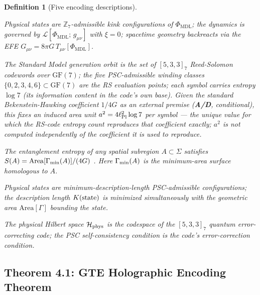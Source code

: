 \documentclass[11pt]{article}
\newtheorem{definition}[theorem]{Definition}
\theoremstyle{remark}
\newcommand{\PHIMDL}{\Phi_{\mathrm{MDL}}}
\newcommand{\ZS}{\mathbb{Z}_7}
\newcommand{\lPl}{\ell_{\rm Pl}}
\newcommand{\Gmunu}{G_{\mu\nu}}
\newcommand{\Tmunu}{T_{\mu\nu}}
\newcommand{\LL}{\mathcal{L}}
\newcommand{\CatAD}{\textbf{A/D}}
\begin{document}
\begin{definition}[Five encoding descriptions]
\label{def:Ti}
\leavevmode
\begin{description}[style=nextline]
  \item[$T_1$ (Lagrangian description):]
    Physical states are $\ZS$-admissible kink configurations of $\PHIMDL$; the dynamics
    is governed by $\LL[\PHIMDL;\,g_{\mu\nu}]$ with $\xi=0$; spacetime geometry
    backreacts via the EFE $\Gmunu = 8\pi G\,\Tmunu[\PHIMDL]$.

  \item[$T_2$ (Algebraic/RS-code description):]
    The Standard Model generation orbit is the set of $[5,3,3]_7$ Reed-Solomon
    codewords over $\mathrm{GF}(7)$; the five PSC-admissible winding classes
    $\{0,2,3,4,6\}\subset\mathrm{GF}(7)$ are the RS evaluation points; each symbol
    carries entropy $\log 7$ (its information content in the code's own base).
    \emph{Given} the standard Bekenstein-Hawking coefficient $1/4G$ as an external
    premise (\CatAD, conditional), this fixes an induced area unit
    $a^2 = 4\lPl^2\log 7$ per symbol --- the unique value for which the RS-code
    entropy count reproduces that coefficient exactly; $a^2$ is not computed
    independently of the coefficient it is used to reproduce.

  \item[$T_3$ (Holographic/RT description):]
    The entanglement entropy of any spatial subregion $A\subset\Sigma$ satisfies
    $S(A) = \mathrm{Area}[\Gamma_{\rm min}(A)]/(4G)$ \cite{Ryu2006}.
    Here $\Gamma_{\rm min}(A)$ is the minimum-area surface homologous to $A$.

  \item[$T_4$ (MDL-information-theoretic description):]
    Physical states are minimum-description-length PSC-admissible configurations; the
    description length $K({\rm state})$ is minimized simultaneously with the geometric
    area $\mathrm{Area}[\Gamma]$ bounding the state.

  \item[$T_5$ (QEC description):]
    The physical Hilbert space $\mathcal{H}_{\rm phys}$ is the codespace of the
    $[5,3,3]_7$ quantum error-correcting code; the PSC self-consistency condition is
    the code's error-correction condition.
\end{description}
\end{definition}

\subsection{Theorem 4.1: GTE Holographic Encoding Theorem}
\label{sec:ghet_thm}
\end{document}
